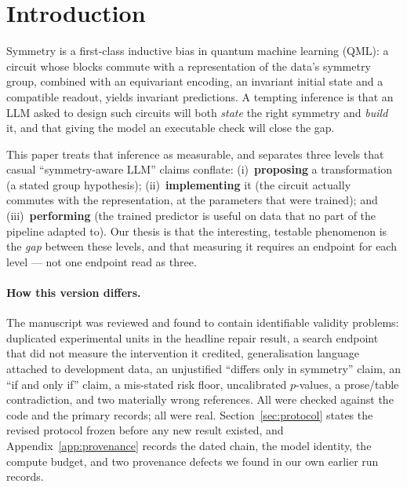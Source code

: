 \documentclass{neurips_2024}
\begin{document}
\section{Introduction}
\label{sec:intro}

Symmetry is a first-class inductive bias in quantum machine learning (QML): a circuit
whose blocks commute with a representation of the data's symmetry group, combined with an
equivariant encoding, an invariant initial state and a compatible readout, yields
invariant predictions. A tempting inference is that an LLM asked to design such circuits
will both \emph{state} the right symmetry and \emph{build} it, and that giving the model
an executable check will close the gap.

This paper treats that inference as measurable, and separates three levels that casual
``symmetry-aware LLM'' claims conflate: (i)~\textbf{proposing} a transformation (a stated
group hypothesis); (ii)~\textbf{implementing} it (the circuit actually commutes with the
representation, at the parameters that were trained); and (iii)~\textbf{performing} (the
trained predictor is useful on data that no part of the pipeline adapted to). Our thesis
is that the interesting, testable phenomenon is the \emph{gap} between these levels, and
that measuring it requires an endpoint for each level --- not one endpoint read as three.

\paragraph{How this version differs.} The manuscript was reviewed and found to contain
identifiable validity problems: duplicated experimental units in the headline repair
result, a search endpoint that did not measure the intervention it credited, generalisation
language attached to development data, an unjustified ``differs only in symmetry'' claim,
an ``if and only if'' claim, a mis-stated risk floor, uncalibrated $p$-values, a
prose/table contradiction, and two materially wrong references. All were checked against
the code and the primary records; all were real. Section~\ref{sec:protocol} states the
revised protocol frozen before any new result existed, and
Appendix~\ref{app:provenance} records the dated chain, the model identity, the compute
budget, and two provenance defects we found in our own earlier run records.
\end{document}
